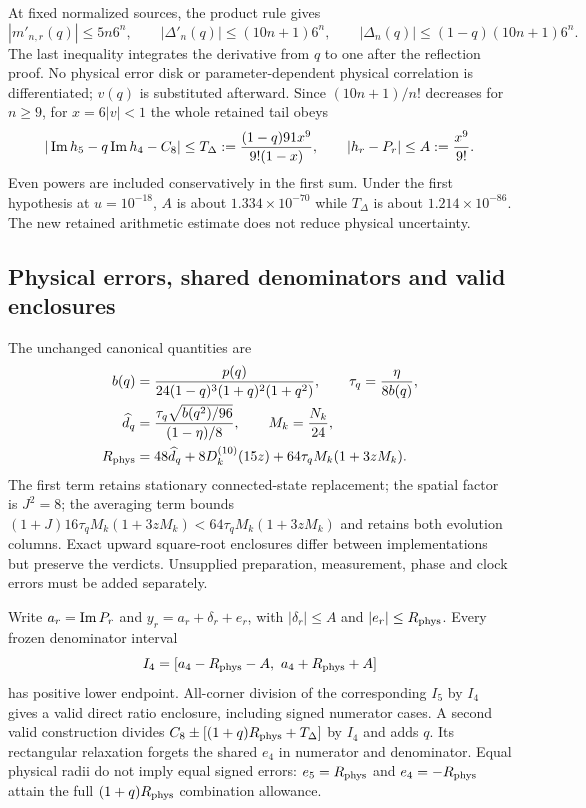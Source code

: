 At fixed normalized sources, the product rule gives
\begin{equation}
 |m'_{n,r}(q)|\le5n6^n,\qquad
 |\Delta'_n(q)|\le(10n+1)6^n,\qquad
 |\Delta_n(q)|\le(1-q)(10n+1)6^n.
 \label{eq:ai3-allorder-moments}
\end{equation}
The last inequality integrates the derivative from $q$ to one after the reflection proof. No physical error disk or parameter-dependent physical correlation is differentiated; $v(q)$ is substituted afterward. Since $(10n+1)/n!$ decreases for $n\ge9$, for $x=6|v|<1$ the whole retained tail obeys
\begin{equation}
 |\operatorname{Im} h_5-q\operatorname{Im} h_4-C_8|
 \le T_\Delta:=\frac{(1-q)91x^9}{9!(1-x)},
 \qquad |h_r-P_r|\le A:=\frac{x^9}{9!}.
 \label{eq:ai3-allorder-tail}
\end{equation}
Even powers are included conservatively in the first sum. Under the first hypothesis at $u=10^{-18}$, $A$ is about $1.334\times10^{-70}$ while $T_\Delta$ is about $1.214\times10^{-86}$. The new retained arithmetic estimate does not reduce physical uncertainty.

\subsection{Physical errors, shared denominators and valid enclosures}
The unchanged canonical quantities are
\begin{align}
 b(q)&=\frac{p(q)}{24(1-q)^3(1+q)^2(1+q^2)},\qquad
 \tau_q=\frac{\eta}{8b(q)},\notag\\
 \widehat d_q&=\frac{\tau_q\sqrt{b(q^2)/96}}{(1-\eta)/8},
 \qquad M_k=\frac{N_k}{24},\notag\\
 R_{\rm phys}&=48\widehat d_q+8D_k^{(10)}(15z)
 +64\tau_qM_k(1+3zM_k).
 \label{eq:ai3-physical-radius}
\end{align}
The first term retains stationary connected-state replacement; the spatial factor is $J^2=8$; the averaging term bounds $(1+J)16\tau_qM_k(1+3zM_k)<64\tau_qM_k(1+3zM_k)$ and retains both evolution columns. Exact upward square-root enclosures differ between implementations but preserve the verdicts. Unsupplied preparation, measurement, phase and clock errors must be added separately.

Write $a_r=\operatorname{Im} P_r$ and $y_r=a_r+\delta_r+e_r$, with $|\delta_r|\le A$ and $|e_r|\le R_{\rm phys}$. Every frozen denominator interval
\begin{equation}
 I_4=[a_4-R_{\rm phys}-A,\ a_4+R_{\rm phys}+A]
 \label{eq:ai3-denominator}
\end{equation}
has positive lower endpoint. All-corner division of the corresponding $I_5$ by $I_4$ gives a valid direct ratio enclosure, including signed numerator cases. A second valid construction divides
$C_8\pm[(1+q)R_{\rm phys}+T_\Delta]$ by $I_4$ and adds $q$. Its rectangular relaxation forgets the shared $e_4$ in numerator and denominator. Equal physical radii do not imply equal signed errors: $e_5=R_{\rm phys}$ and $e_4=-R_{\rm phys}$ attain the full $(1+q)R_{\rm phys}$ combination allowance.


